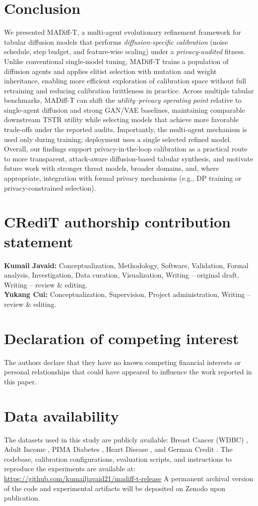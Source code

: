 \documentclass[preprint,12pt]{elsarticle}
\begin{document}
\section{Conclusion}
We presented MADiff-T, a multi-agent evolutionary refinement framework for tabular diffusion models that performs \emph{diffusion-specific calibration} (noise schedule, step budget, and feature-wise scaling) under a \emph{privacy-audited} fitness. Unlike conventional single-model tuning, MADiff-T trains a population of diffusion agents and applies elitist selection with mutation and weight inheritance, enabling more efficient exploration of calibration space without full retraining and reducing calibration brittleness in practice. Across multiple tabular benchmarks, MADiff-T can shift the \emph{utility--privacy operating point} relative to single-agent diffusion and strong GAN/VAE baselines, maintaining comparable downstream TSTR utility while selecting models that achieve more favorable trade-offs under the reported audits. Importantly, the multi-agent mechanism is used only during training; deployment uses a single selected refined model. Overall, our findings support privacy-in-the-loop calibration as a practical route to more transparent, attack-aware diffusion-based tabular synthesis, and motivate future work with stronger threat models, broader domains, and, where appropriate, integration with formal privacy mechanisms (e.g., DP training or privacy-constrained selection).
\section*{CRediT authorship contribution statement}
\textbf{Kumail Javaid:} Conceptualization, Methodology, Software, Validation, Formal analysis, Investigation, Data curation, Visualization, Writing -- original draft, Writing -- review \& editing.\\
\textbf{Yukang Cui:} Conceptualization, Supervision, Project administration, Writing -- review \& editing.\\

\section*{Declaration of competing interest}
The authors declare that they have no known competing financial interests or personal relationships that could have appeared to influence the work reported in this paper.

\section*{Data availability}
The datasets used in this study are publicly available: Breast Cancer (WDBC) \cite{BreastCancerWDBC}, Adult Income \cite{AdultIncome}, PIMA Diabetes \cite{PimaDiabetes}, Heart Disease \cite{HeartDisease}, and German Credit \cite{GermanCredit}.
The codebase, calibration configurations, evaluation scripts, and instructions to reproduce the experiments are available at:
\url{https://github.com/kumailjavaid21/madiff-t-release}
A permanent archival version of the code and experimental artifacts will be deposited on Zenodo upon publication.
\end{document}
